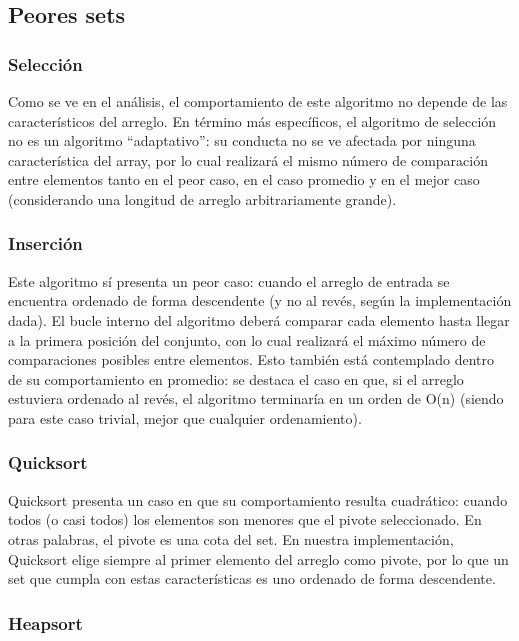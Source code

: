 \documentclass[article,a4paper]{article}
\begin{document}
\subsection{Peores sets}

\subsubsection{Selección}

Como se ve en el análisis, el comportamiento de este algoritmo no depende de las característicos del arreglo. En término más específicos, el algoritmo de selección no es un algoritmo “adaptativo”: su conducta no se ve afectada por ninguna característica del array, por lo cual realizará el mismo número de comparación entre elementos tanto en el peor caso, en el caso promedio y en el mejor caso (considerando una longitud de arreglo arbitrariamente grande).

\subsubsection{Inserción}

Este algoritmo sí presenta un peor caso: cuando el arreglo de entrada se encuentra ordenado de forma descendente (y no al revés, según la implementación dada). El bucle interno del algoritmo deberá comparar cada elemento hasta llegar a la primera posición del conjunto, con lo cual realizará el máximo número de comparaciones posibles entre elementos. Esto también está contemplado dentro de su comportamiento en promedio: se destaca el caso en que, si el arreglo estuviera ordenado al revés, el algoritmo terminaría en un orden de O(n) (siendo para este caso trivial, mejor que cualquier ordenamiento).

\subsubsection{Quicksort}

Quicksort presenta un caso en que su comportamiento resulta cuadrático: cuando todos (o casi todos) los elementos son  menores que el pivote seleccionado. En otras palabras, el pivote es una cota del set. En nuestra implementación, Quicksort elige siempre al primer elemento del arreglo como pivote, por lo que un set que cumpla con estas características es uno ordenado de forma  descendente.

\subsubsection{Heapsort}
\end{document}
